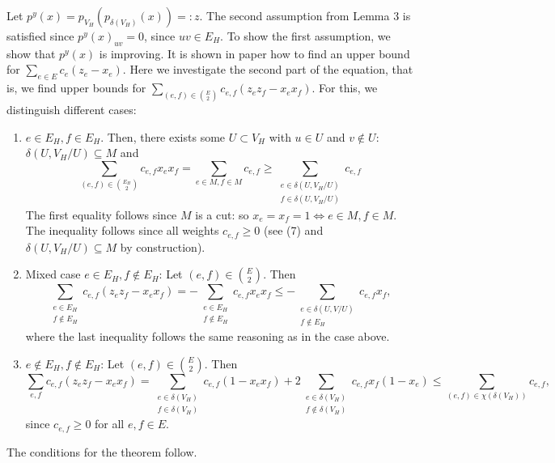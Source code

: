Let $p^y(x) = p_{V_H}(p_{\delta(V_H)}(x))=:z$. The second assumption from Lemma 3 is satisfied since ${p^y(x)}_{uv}=0$, since $uv \in E_H$. 
To show the first assumption, we show that $p^y(x)$ is improving. 
It is shown in paper \cite{Comb} how to find an upper bound for 
$\sum_{e \in E} c_e (z_e - x_e)$. Here we investigate the second part of the equation, that is, we find upper bounds for 
$\sum_{(e,f) \in {E \choose 2} } c_{e,f} (z_e z_f - x_e x_f)$. For this, we distinguish different cases: 
\begin{enumerate}
    \item $e \in E_H, f \in E_H$. Then, there exists some $U \subset V_H$ with $u \in U$ and $v \notin U$: $\delta(U,V_H/U) \subseteq M$ and 
    \begin{equation}
        \sum_{(e,f) \in {E_H \choose 2}} c_{e,f} x_e x_f = \sum_{e \in M, f \in M} c_{e,f} \geq \sum_{ \substack{e \in \delta(U,V_H/U) \\ f \in \delta(U, V_H/U)}} c_{e,f} 
    \end{equation}
    The first equality follows since $M$ is a cut: so $x_e = x_f=1 \iff e \in M, f \in M$. The inequality follows since all weights $c_{e,f} \geq 0 $ (see (7) and $\delta(U,V_H/U) \subseteq M$ by construction).
    \item Mixed case $e \in E_H, f \notin E_H$: Let $(e,f) \in {E \choose 2}$. Then 
    \begin{equation*}
        \sum_{ \substack{e \in E_H \\ f \notin E_H }} c_{e,f} (z_e z_f - x_e x_f) = -\sum_{\substack{ e \in E_H \\ f \notin E_H }} c_{e,f} x_e x_f \leq - \sum_{ \substack{e \in \delta(U, V/U) \\ f \notin E_H }} c_{e,f} x_f, 
    \end{equation*}
    where the last inequality follows the same reasoning as in the case above. 
    \item $e \notin E_H, f \notin E_H$: Let $(e,f) \in {E \choose 2}$. Then 
    \begin{equation*}
        \sum_{ e,f} c_{e,f} (z_e z_f - x_e x_f) = \sum_{\substack{e \in \delta(V_H) \\ f \in \delta(V_H)}} c_{e,f} (1-x_e x_f) + 2 \sum_{\substack{e \in \delta(V_H)  \\ f \notin \delta(V_H)}} c_{e,f} x_f (1-x_e) 
        \leq \sum_{ (e,f) \in \chi(\delta(V_H))} c_{e,f},
    \end{equation*}
    since $c_{e,f} \geq 0$ for all $e,f \in E$. 
\end{enumerate}
The conditions for the theorem follow. 


